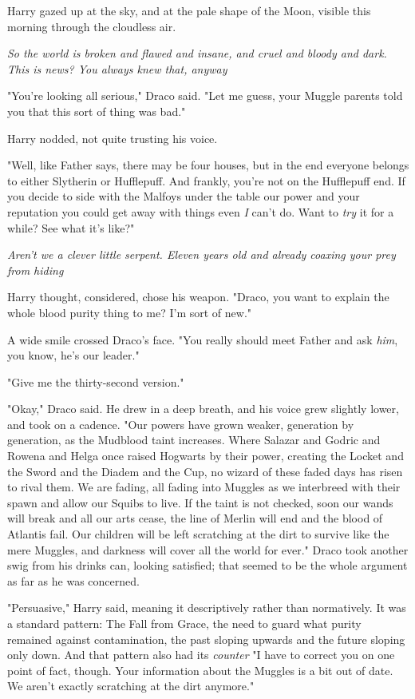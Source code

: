 Harry gazed up at the sky, and at the pale shape of the Moon, visible this
morning through the cloudless air.

\emph{So the world is broken and flawed and insane, and cruel and bloody and
dark. This is news? You always knew that, anyway{\el}}

"You're looking all serious," Draco said. "Let me guess, your Muggle parents
told you that this sort of thing was bad."

Harry nodded, not quite trusting his voice.

"Well, like Father says, there may be four houses, but in the end everyone
belongs to either Slytherin or Hufflepuff. And frankly, you're not on the
Hufflepuff end. If you decide to side with the Malfoys under the table{\el}
our power and your reputation{\el} you could get away with things even
\emph{I} can't do. Want to \emph{try} it for a while? See what it's like?"

\emph{Aren't we a clever little serpent. Eleven years old and already coaxing
your prey from hiding{\el}}

Harry thought, considered, chose his weapon. "Draco, you want to explain the
whole blood purity thing to me? I'm sort of new."

A wide smile crossed Draco's face. "You really should meet Father and ask
\emph{him}, you know, he's our leader."

"Give me the thirty-second version."

"Okay," Draco said. He drew in a deep breath, and his voice grew slightly
lower, and took on a cadence. "Our powers have grown weaker, generation by
generation, as the Mudblood taint increases. Where Salazar and Godric and
Rowena and Helga once raised Hogwarts by their power, creating the Locket and
the Sword and the Diadem and the Cup, no wizard of these faded days has risen
to rival them. We are fading, all fading into Muggles as we interbreed with
their spawn and allow our Squibs to live. If the taint is not checked, soon our
wands will break and all our arts cease, the line of Merlin will end and the
blood of Atlantis fail. Our children will be left scratching at the dirt to
survive like the mere Muggles, and darkness will cover all the world for ever."
Draco took another swig from his drinks can, looking satisfied; that seemed to
be the whole argument as far as he was concerned.

"Persuasive," Harry said, meaning it descriptively rather than normatively. It
was a standard pattern: The Fall from Grace, the need to guard what purity
remained against contamination, the past sloping upwards and the future sloping
only down. And that pattern also had its \emph{counter}{\el} "I have to
correct you on one point of fact, though. Your information about the Muggles is
a bit out of date. We aren't exactly scratching at the dirt anymore."

